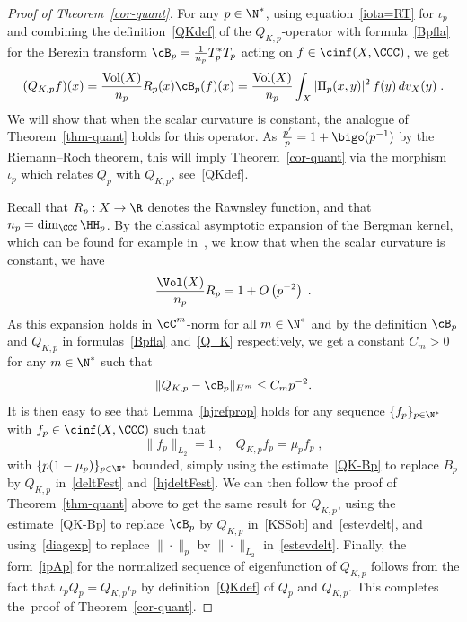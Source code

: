 \begin{proof}[Proof of Theorem~\ref{cor-quant}]
For any $p\in\N^*$, using equation~\eqref{iota=RT} for $\iota_p$ and combining the definition~\eqref{QKdef} of the $Q_{K,p}$-operator with formula~\eqref{Bpfla} for the Berezin transform $\cB_p= \frac{1}{n_p} T^*_p T_p$ acting on $f\in\cinf(X,\CCC)$, we get
\begin{equation}\label{Q_K}
(Q_{K,p} f)(x)= \frac{\text{Vol}(X)}{n_p} R_p(x) \cB_p(f)(x) = \frac{\text{Vol}(X)}{n_p}
\int_X |\Pi_p(x,y)|^2\,f(y)\,dv_X(y)\;.
\end{equation}
We will show that when the scalar curvature is constant, the analogue of Theorem~\ref{thm-quant} holds for this operator. As $\frac{p'}{p} = 1 + \bigo(p^{-1})$ by the Riemann--Roch theorem, this will imply Theorem~\ref{cor-quant} via the morphism $\iota_p$ which relates $Q_p$ with $Q_{K,p}$, see~\eqref{QKdef}.

Recall that $R_p:X\to\R$ denotes the Rawnsley function, and that $n_p=\dim_\CCC\HH_p$. By the classical asymptotic expansion of the Bergman kernel, which can be found for example in~\cite[Section~4.1.1]{MM07}, we know that when the scalar curvature is constant, we have
\begin{equation}
\frac{\Vol(X)}{n_p}R_p=1+O\left(p^{-2}\right)\;.
\end{equation}
As this expansion holds in $\cC^m$-norm for all $m\in\N^*$ and by the definition $\cB_p$ and $Q_{K,p}$ in formulas~\eqref{Bpfla} and~\eqref{Q_K} respectively, we get a constant $C_m>0$ for any $m\in\N^*$ such that
\begin{equation}\label{QK-Bp}
\|Q_{K,p}-\cB_p\|_{H^m}\leq C_m p^{-2}.
\end{equation}
It is then easy to see that Lemma~\ref{hjrefprop} holds for any sequence $\{f_p\}_{p\in\N^*}$ with $f_p\in\cinf(X,\CCC)$ such that
\begin{equation}\label{efQKp}
\|f_p\|_{L_2}=1\;,\quad Q_{K,p}f_p=\mu_p f_p\;,
\end{equation}
with $\{p(1-\mu_p)\}_{p\in\N^*}$ bounded, simply using the estimate~\eqref{QK-Bp} to replace $B_p$ by $Q_{K,p}$ in~\eqref{deltFest} and~\eqref{hjdeltFest}. We can then follow the proof of Theorem~\ref{thm-quant} above to get the same result for $Q_{K,p}$, using the estimate~\eqref{QK-Bp} to replace $\cB_p$ by $Q_{K,p}$ in~\eqref{KSSob} and~\eqref{estevdelt}, and using~\eqref{diagexp} to replace $\|\cdot\|_p$ by $\|\cdot\|_{L_2}$ in~\eqref{estevdelt}. Finally, the form~\eqref{ipAp} for the normalized sequence of eigenfunction of $Q_{K,p}$ follows from the fact that $\iota_pQ_p = Q_{K,p}\iota_p$ by definition~\eqref{QKdef} of $Q_p$ and $Q_{K,p}$. This completes the~proof of Theorem~\ref{cor-quant}.
\end{proof}


